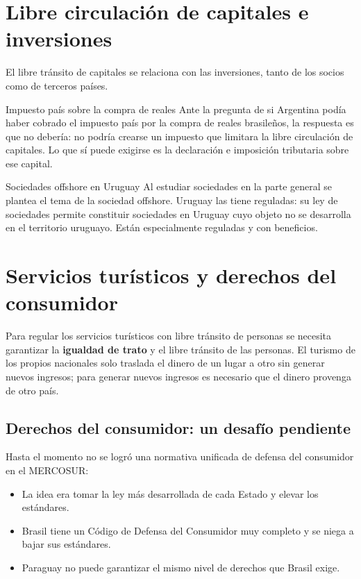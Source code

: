 \documentclass[12pt,oneside]{book}
\begin{document}
\section{Libre circulación de capitales e inversiones}

El libre tránsito de capitales se relaciona con las inversiones, tanto de los socios como de terceros países.

\begin{example}{Impuesto país sobre la compra de reales}
Ante la pregunta de si Argentina podía haber cobrado el impuesto país por la compra de reales brasileños, la respuesta es que no debería: no podría crearse un impuesto que limitara la libre circulación de capitales. Lo que sí puede exigirse es la declaración e imposición tributaria sobre ese capital.
\end{example}

\begin{example}{Sociedades offshore en Uruguay}
Al estudiar sociedades en la parte general se plantea el tema de la sociedad offshore. Uruguay las tiene reguladas: su ley de sociedades permite constituir sociedades en Uruguay cuyo objeto no se desarrolla en el territorio uruguayo. Están especialmente reguladas y con beneficios.
\end{example}

\section{Servicios turísticos y derechos del consumidor}

Para regular los servicios turísticos con libre tránsito de personas se necesita garantizar la \textbf{igualdad de trato} y el libre tránsito de las personas. El turismo de los propios nacionales solo traslada el dinero de un lugar a otro sin generar nuevos ingresos; para generar nuevos ingresos es necesario que el dinero provenga de otro país.

\subsection{Derechos del consumidor: un desafío pendiente}

Hasta el momento no se logró una normativa unificada de defensa del consumidor en el MERCOSUR:

\begin{itemize}
    \item La idea era tomar la ley más desarrollada de cada Estado y elevar los estándares.
    \item Brasil tiene un Código de Defensa del Consumidor muy completo y se niega a bajar sus estándares.
    \item Paraguay no puede garantizar el mismo nivel de derechos que Brasil exige.
\end{itemize}
\end{document}
